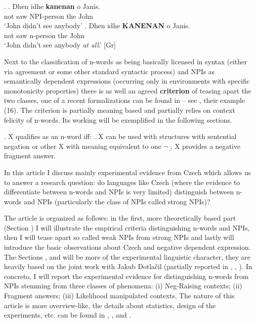 \documentclass[12pt]{scrartcl}
\begin{document}
\ex. \ag. Dhen idhe \textbf{kanenan} o Janis.\\
not saw NPI-person the John\\
`John didn't see anybody' \bg. Dhen idhe \textbf{KANENAN} o Janis.\\
not saw n-person the John\\
`John didn't see anybody \emph{at all}.' \hfill [Gr]

Next to the classification of n-words as being basically licensed in syntax (either via agreement or some other standard syntactic process) and NPIs as semantically dependent expressions (occurring only in environments with specific monotonicity properties) there is as well an agreed \textbf{criterion} of teasing apart the two classes, one of a recent formalizations can be found in \cite{giannakidou2017landscape} -- see \Next, their example (16). The criterion is partially meaning based and partially relies on context felicity of n-words. Its working will be exemplified in the following sections.

\ex. X qualifies as an n-word iff:\label{nwords-npi-crit} \a. X can be used with structures
with sentential negation or other X with meaning equivalent to one
\(\neg\) \b. X provides a negative fragment answer.

In this article I discuss mainly experimental evidence from Czech which allows us to answer a research question: do languages like Czech (where the evidence to differentiate between n-words and NPIs is very limited) distinguish between n-words and NPIs (particularly the class of NPIs called strong NPIs)?

The article is organized as follows: in the first, more theoretically based part (Section \textbf{}) I will illustrate the empirical criteria distinguishing n-words and NPIs, then I will tease apart so called weak NPIs from strong NPIs and lastly will introduce the basic observations about Czech and negative dependent expression. The Sections \textbf{}, \textbf{} and \textbf{} will be more of the experimental linguistic character, they are heavily based on the joint work with Jakub Dotlačil (partially reported in \citealt{dovcekal2016experimental}, \citealt{docekaldotlacilsubedin}, \citealt{docekaldotlacilsubber}). In concreto, I will report the experimental evidence for distinguishing n-words from NPIs stemming from three classes of phenomena: (i) Neg-Raising contexts; (ii) Fragment answers; (iii) Likelihood manipulated contexts. The nature of this article is more overview-like, the details about statistics, design of the experiments, etc. can be found in \cite{dovcekal2016experimental}, \cite{docekaldotlacilsubedin}, \cite{docekaldotlacilsubber} and \cite{docekalsafratovaoli}.
\end{document}
